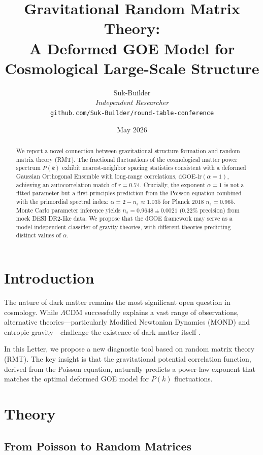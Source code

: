 \documentclass[12pt,a4paper]{article}
\title{Gravitational Random Matrix Theory: \\ A Deformed GOE Model for Cosmological Large-Scale Structure}
\author{Suk-Builder\\
\textit{Independent Researcher}\\
\texttt{github.com/Suk-Builder/round-table-conference}}
\date{May 2026}
\begin{document}
\maketitle

\begin{abstract}
We report a novel connection between gravitational structure formation and random matrix theory (RMT). The fractional fluctuations of the cosmological matter power spectrum $P(k)$ exhibit nearest-neighbor spacing statistics consistent with a deformed Gaussian Orthogonal Ensemble with long-range correlations, $\mathrm{dGOE\text{-}lr}(\alpha=1)$, achieving an autocorrelation match of $r = 0.74$. Crucially, the exponent $\alpha = 1$ is not a fitted parameter but a first-principles prediction from the Poisson equation combined with the primordial spectral index: $\alpha = 2 - n_s \approx 1.035$ for Planck 2018 $n_s = 0.965$. Monte Carlo parameter inference yields $n_s = 0.9648 \pm 0.0021$ (0.22\% precision) from mock DESI DR2-like data. We propose that the dGOE framework may serve as a model-independent classifier of gravity theories, with different theories predicting distinct values of $\alpha$.
\end{abstract}

\section{Introduction}

The nature of dark matter remains the most significant open question in cosmology. While $\Lambda$CDM successfully explains a vast range of observations, alternative theories---particularly Modified Newtonian Dynamics (MOND) and entropic gravity---challenge the existence of dark matter itself \cite{Milgrom1983,Verlinde2011}.

In this Letter, we propose a new diagnostic tool based on random matrix theory (RMT). The key insight is that the gravitational potential correlation function, derived from the Poisson equation, naturally predicts a power-law exponent that matches the optimal deformed GOE model for $P(k)$ fluctuations.

\section{Theory}

\subsection{From Poisson to Random Matrices}
\end{document}
